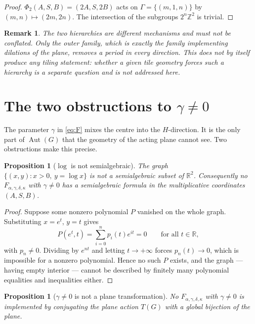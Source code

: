 \documentclass[11pt]{article}
\newtheorem{proposition}[theorem]{Proposition}
\newtheorem{remark}[theorem]{Remark}
\begin{document}
\begin{proof}
$\Phi_2(A,S,B)=(2A,S,2B)$ acts on $\Gamma=\{(m,1,n)\}$ by $(m,n)\mapsto(2m,2n)$.
The intersection of the subgroups $2^n\mathbb Z^2$ is trivial.
\end{proof}

\begin{remark}
The two hierarchies are different mechanisms and must not be conflated. Only the
outer family, which is exactly the family implementing dilations of the plane,
removes a period in \emph{every} direction. This does \emph{not} by itself
produce any tiling statement: whether a given tile geometry \emph{forces} such a
hierarchy is a separate question and is not addressed here.
\end{remark}

\section{The two obstructions to \texorpdfstring{$\gamma\ne0$}{gamma != 0}}
\label{sec:obstructions}

The parameter $\gamma$ in \eqref{eq:F} mixes the centre into the $H$-direction.
It is the only part of $\operatorname{Aut}(G)$ that the geometry of the acting
plane cannot see. Two obstructions make this precise.

\begin{proposition}[$\log$ is not semialgebraic]
\label{prop:log-not-semialgebraic}
The graph $\{(x,y):x>0,\ y=\log x\}$ is not a semialgebraic subset of
$\mathbb R^2$. Consequently no $F_{\alpha,\gamma,\delta,\kappa}$ with
$\gamma\ne0$ has a semialgebraic formula in the multiplicative coordinates
$(A,S,B)$.
\end{proposition}

\begin{proof}
Suppose some nonzero polynomial $P$ vanished on the whole graph. Substituting
$x=e^t$, $y=t$ gives
\[
P(e^t,t)=\sum_{i=0}^{n}p_i(t)e^{it}=0\qquad\text{for all }t\in\mathbb R,
\]
with $p_n\ne0$. Dividing by $e^{nt}$ and letting $t\to+\infty$ forces
$p_n(t)\to0$, which is impossible for a nonzero polynomial. Hence no such $P$
exists, and the graph --- having empty interior --- cannot be described by
finitely many polynomial equalities and inequalities either.
\end{proof}

\begin{proposition}[$\gamma\ne0$ is not a plane transformation]
\label{prop:gamma-not-plane}
No $F_{\alpha,\gamma,\delta,\kappa}$ with $\gamma\ne0$ is implemented by
conjugating the plane action $T(G)$ with a global bijection of the plane.
\end{proposition}
\end{document}
